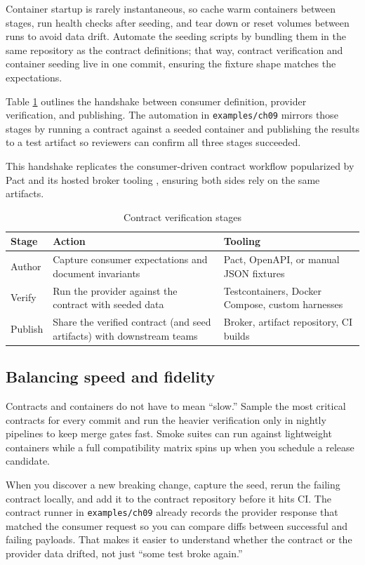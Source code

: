 Container startup is rarely instantaneous, so cache warm containers between stages, run health checks after seeding, and tear down or reset volumes between runs to avoid data drift. Automate the seeding scripts by bundling them in the same repository as the contract definitions; that way, contract verification and container seeding live in one commit, ensuring the fixture shape matches the expectations.

Table \ref{tab:contract-stages} outlines the handshake between consumer definition, provider verification, and publishing. The automation in \texttt{examples/ch09} mirrors those stages by running a contract against a seeded container and publishing the results to a test artifact so reviewers can confirm all three stages succeeded.

This handshake replicates the consumer-driven contract workflow popularized by Pact and its hosted broker tooling \citep{pactflow2023}, ensuring both sides rely on the same artifacts.

\begin{table}[h]
\centering
\caption{Contract verification stages}
\label{tab:contract-stages}
\begin{tabular}{p{4cm}p{4cm}p{4cm}}
\toprule
Stage & Action & Tooling \\
\midrule
Author & Capture consumer expectations and document invariants & Pact, OpenAPI, or manual JSON fixtures \\
Verify & Run the provider against the contract with seeded data & Testcontainers, Docker Compose, custom harnesses \\
Publish & Share the verified contract (and seed artifacts) with downstream teams & Broker, artifact repository, CI builds \\
\bottomrule
\end{tabular}
\end{table}

\subsection{Balancing speed and fidelity}
Contracts and containers do not have to mean ``slow.'' Sample the most critical contracts for every commit and run the heavier verification only in nightly pipelines to keep merge gates fast. Smoke suites can run against lightweight containers while a full compatibility matrix spins up when you schedule a release candidate.

When you discover a new breaking change, capture the seed, rerun the failing contract locally, and add it to the contract repository before it hits CI. The contract runner in \texttt{examples/ch09} already records the provider response that matched the consumer request so you can compare diffs between successful and failing payloads. That makes it easier to understand whether the contract or the provider data drifted, not just ``some test broke again.''

